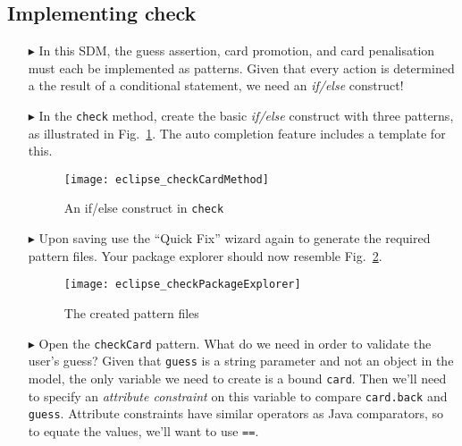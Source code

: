 \newpage
\hypertarget{checkCard tex}{}
\subsection{Implementing check}
\texHeader
 
\begin{itemize}
   
\item[$\blacktriangleright$] In this SDM, the guess assertion, card promotion, and card penalisation must each be implemented as patterns. Given that every
action is determined a the result of a conditional statement, we need an \emph{if/else} construct!

\item[$\blacktriangleright$] In the \texttt{check} method, create the basic \emph{if/else} construct with three patterns, as illustrated in
Fig.~\ref{fig:checkDec}. The auto completion feature includes a template for this.

\vspace{0.5cm}

\begin{figure}[htbp]
\begin{center}
  \texttt{[image: eclipse\_checkCardMethod]}
  \caption{An if/else construct in \texttt{check}}
  \label{fig:checkDec}
\end{center}
\end{figure} 

\item[$\blacktriangleright$] Upon saving use the ``Quick Fix'' wizard again to generate the required pattern files. Your package explorer should now resemble
Fig.~\ref{fig:checkPatternsExplorer}.

\begin{figure}[htbp]
\begin{center}
  \texttt{[image: eclipse\_checkPackageExplorer]}
  \caption{The created pattern files}
  \label{fig:checkPatternsExplorer}
\end{center}
\end{figure} 

\item[$\blacktriangleright$] Open the \texttt{checkCard} pattern. What do we need in order to validate the user's guess? Given that \texttt{guess} is a string
parameter and not an object in the model, the only variable we need to create is a bound \texttt{card}. Then we'll need to specify an \emph{attribute
constraint} on this variable to compare \texttt{card.back} and \texttt{guess}. Attribute constraints have similar operators as Java comparators, so to equate
the values, we'll want to use \texttt{==}.


\end{itemize}
